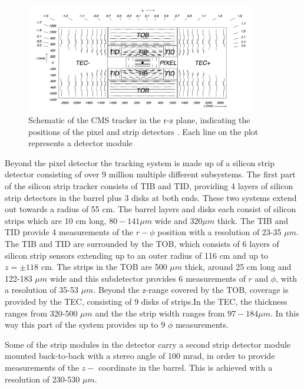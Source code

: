 \begin{figure}[h!]
\begin{center}
\includegraphics[width=0.9\textwidth]{./Detector/Plots/Tracker.png}
\caption{Schematic of the CMS tracker in the r-z plane, indicating the
positions of the pixel and strip detectors \cite{cms-jinst}. Each line 
on the plot represents a detector module}
\label{fig:CMS_tracker}
\end{center}
\end{figure}


Beyond the pixel detector the tracking system is made up of a silicon
strip detector consisting of over 9 million multiple different subsystems. The first part of the
silicon strip tracker consists of \ac{TIB} and \ac{TID}, providing 4 layers of
silicon strip detectors in the barrel plus 3 disks at both ends. These two systems
extend out towards a radius of 55 cm. The barrel layers and disks each consist
of silicon strips which are 10 cm long, $80-141\mu m$ wide and $320 \mu m$ thick. The \ac{TIB} and \ac{TID}
provide 4 measurements of the $r-\phi$ position  with a resolution of 23-35 $\mu m$.
The \ac{TIB} and \ac{TID} are surrounded by the \ac{TOB}, which consists of 6 layers of silicon strip sensors extending
up to an outer radius of 116 cm and up to $z=\pm 118$ cm. The strips in the \ac{TOB} are 500 $\mu m$ thick, around 25 cm long and 122-183 $\mu m$ 
wide and this subdetector provides 6 measurements of $r$ and $\phi$, with a resolution
of 35-53 $\mu m$. Beyond the z-range covered by the \ac{TOB}, coverage is provided by the \ac{TEC},
consisting of 9 disks of strips.In the \ac{TEC}, the thickness ranges from 320-500 $\mu m$ and the the strip width ranges from $97-184 \mu m$.
In this way this part of the system provides up to 9 $\phi$ measurements.

Some of the strip modules in the detector carry a second strip detector module mounted back-to-back with a stereo angle %
of 100 mrad, in order to provide measurements of the $z-$ coordinate in the barrel. This is achieved with a resolution of 230-530 $\mu m$.

